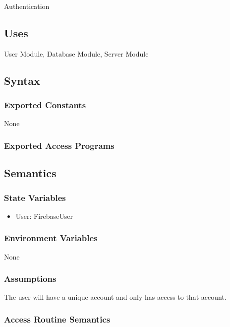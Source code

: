\documentclass[12pt, titlepage]{article}
\begin{document}
Authentication

\subsection{Uses}

User Module, Database Module, Server Module

\subsection{Syntax}

\subsubsection{Exported Constants}
None

\subsubsection{Exported Access Programs}

\subsection{Semantics}

\subsubsection{State Variables}

\begin{itemize}
\item User: FirebaseUser
\end{itemize}

\subsubsection{Environment Variables}

None

\subsubsection{Assumptions}

The user will have a unique account and only has access to that account.

\subsubsection{Access Routine Semantics}
\end{document}
